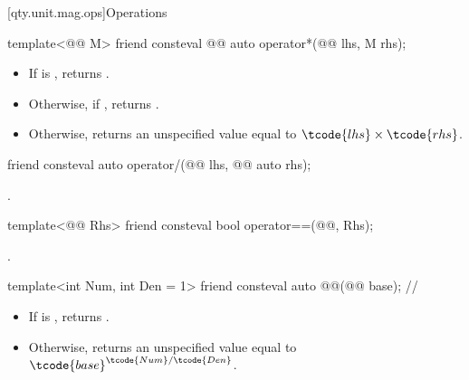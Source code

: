 [qty.unit.mag.ops]{Operations}

\begin{itemdecl}
template<@@ M>
friend consteval @@ auto operator*(@@ lhs, M rhs);
\end{itemdecl}

\begin{itemdescr}
\pnum
\returns
\begin{itemize}
\item
If  is , returns .
\item
Otherwise, if , returns .
\item
Otherwise, returns an unspecified value equal to $\tcode{lhs} \times \tcode{rhs}$.
\end{itemize}
\end{itemdescr}

\begin{itemdecl}
friend consteval auto operator/(@@ lhs, @@ auto rhs);
\end{itemdecl}

\begin{itemdescr}
\pnum
\returns
{}.
\end{itemdescr}

\begin{itemdecl}
template<@@ Rhs>
friend consteval bool operator==(@@, Rhs);
\end{itemdecl}

\begin{itemdescr}
\pnum
\returns
{}.
\end{itemdescr}

\begin{itemdecl}
template<int Num, int Den = 1>
friend consteval auto @@(@@ base);  // \expos
\end{itemdecl}

\begin{itemdescr}
\pnum
\returns
\begin{itemize}
\item
If  is , returns .
\item
Otherwise, returns an unspecified value equal to $\tcode{base}^{\tcode{Num}/\tcode{Den}}$.
\end{itemize}
\end{itemdescr}


